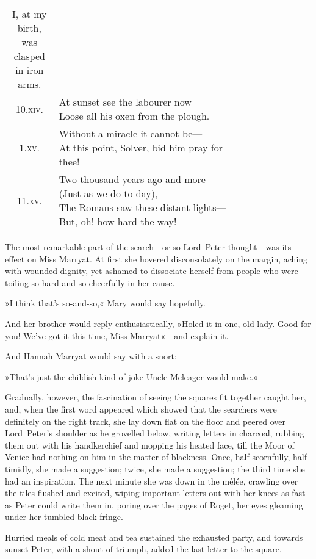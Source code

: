 \begin{longtable} {c p{0.8\linewidth}}
{I, at my birth, was clasped in iron arms.}\\
10.\textsc{xiv.} &  \makecell[l]{At sunset see the labourer now\\
Loose all his oxen from the plough.}\\
1.\textsc{xv.} &  \makecell[l]{Without a miracle it cannot be—\\
At this point, Solver, bid him pray for thee!}\\[.3cm] 
11.\textsc{xv.} &  \makecell[l]{Two thousand years ago and more\\
(Just as we do to-day),\\
The Romans saw these distant lights—\\
But, oh! how hard the way!}
\end{longtable}

\divider
The most remarkable part of the search—or so Lord~Peter thought—was its effect on Miss Marryat. At first she hovered disconsolately on the margin, aching with wounded dignity, yet ashamed to dissociate herself from people who were toiling so hard and so cheerfully in her cause.

»I think that's so-and-so,« Mary would say hopefully.

And her brother would reply enthusiastically, »Holed it in one, old lady. Good for you! We've got it this time, Miss Marryat«—and explain it.

And Hannah Marryat would say with a snort:

»That's just the childish kind of joke Uncle Meleager would make.«

Gradually, however, the fascination of seeing the squares fit together caught her, and, when the first word appeared which showed that the searchers were definitely on the right track, she lay down flat on the floor and peered over Lord~Peter's shoulder as he grovelled below, writing letters in charcoal, rubbing them out with his handkerchief and mopping his heated face, till the Moor of Venice had nothing on him in the matter of blackness. Once, half scornfully, half timidly, she made a suggestion; twice, she made a suggestion; the third time she had an inspiration. The next minute she was down in the mêlée, crawling over the tiles flushed and excited, wiping important letters out with her knees as fast as Peter could write them in, poring over the pages of Roget, her eyes gleaming under her tumbled black fringe.

Hurried meals of cold meat and tea sustained the exhausted party, and towards sunset Peter, with a shout of triumph, added the last letter to the square.

